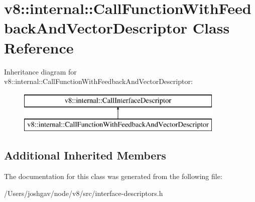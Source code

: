 \hypertarget{classv8_1_1internal_1_1_call_function_with_feedback_and_vector_descriptor}{}\section{v8\+:\+:internal\+:\+:Call\+Function\+With\+Feedback\+And\+Vector\+Descriptor Class Reference}
\label{classv8_1_1internal_1_1_call_function_with_feedback_and_vector_descriptor}
Inheritance diagram for v8\+:\+:internal\+:\+:Call\+Function\+With\+Feedback\+And\+Vector\+Descriptor\+:\begin{figure}[H]
\begin{center}
\leavevmode
\includegraphics[height=2.000000cm]{classv8_1_1internal_1_1_call_function_with_feedback_and_vector_descriptor}
\end{center}
\end{figure}
\subsection*{Additional Inherited Members}


The documentation for this class was generated from the following file\+:\begin{DoxyCompactItemize}
\item 
/\+Users/joshgav/node/v8/src/interface-\/descriptors.\+h\end{DoxyCompactItemize}
